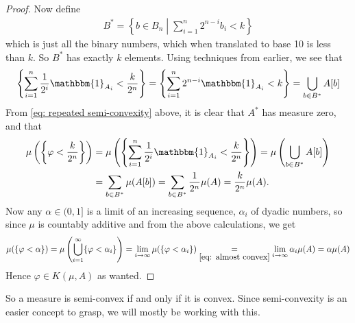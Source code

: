 \begin{proof}
Now define
\begin{align*}
	B^{*}=\left\{b\in B_{n} \middle| \sum_{i=1}^{n} 2^{n-i}b_{i} < k \right\}
\end{align*}
which is just all the binary numbers, which when translated to base 10 is less than $k$. So $B^{*}$ has exactly $k$ elements. Using techniques from earlier, we see that
\begin{align*}
	\left\{ \sum_{i=1}^{n} \frac{1}{2^{i}} \mathbbm{1}_{A_{i}} < \frac{k}{2^{n}} \right\} = \left\{ \sum_{i=1}^{n} 2^{n-i} \mathbbm{1}_{A_{i}} < k \right\} = \bigcup_{b\in B^{*}} A[b]
\end{align*}
From \eqref{eq: repeated semi-convexity} above, it is clear that $A^{*}$ has measure zero, and that
\begin{align}
	\mu\left( \left\{ \varphi < \frac{k}{2^{n}} \right\} \right) &= \mu\left( \left\{ \sum_{i=1}^{n} \frac{1}{2^{i}}\mathbbm{1}_{A_{i}} < \frac{k}{2^{n}} \right\} \right) = \mu\left( \bigcup_{b\in B^{*}} A[b] \right) \nonumber \\
	&= \sum_{b\in B^{*}} \mu(A[b]) = \sum_{b\in B^{*}} \frac{1}{2^{n}} \mu(A) = \frac{k}{2^{n}}\mu(A). \label{eq: almost convex}
\end{align}
Now any $\alpha\in (0,1]$ is a limit of an increasing sequence, $\alpha_{i}$ of dyadic numbers, so since $\mu$ is countably additive and from the above calculations, we get
\begin{align*}
	\mu( \{ \varphi < \alpha \} ) = \mu\left( \bigcup_{i=1}^{\infty} \{ \varphi < \alpha_{i} \} \right) = \lim_{i\to \infty} \mu( \{ \varphi < \alpha_{i} \} ) \underset{\eqref{eq: almost convex}}{=} \lim_{i\to \infty} \alpha_{i}\mu(A) = \alpha \mu(A)
\end{align*}
Hence $\varphi\in K(\mu, A)$ as wanted.
\end{proof}

So a measure is semi-convex if and only if it is convex. Since semi-convexity is an easier concept to grasp, we will mostly be working with this.


